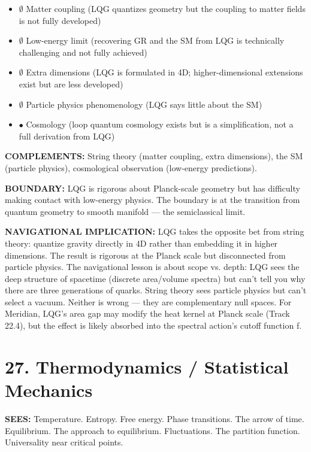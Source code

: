 \begin{itemize}[nosep,leftmargin=*]
  \item $\emptyset$ Matter coupling (LQG quantizes geometry but the coupling to matter fields is not fully developed)
  \item $\emptyset$ Low-energy limit (recovering GR and the SM from LQG is technically challenging and not fully achieved)
  \item $\emptyset$ Extra dimensions (LQG is formulated in 4D; higher-dimensional extensions exist but are less developed)
  \item $\emptyset$ Particle physics phenomenology (LQG says little about the SM)
  \item $\bullet$ Cosmology (loop quantum cosmology exists but is a simplification, not a full derivation from LQG)
\end{itemize}


\textbf{COMPLEMENTS:} String theory (matter coupling, extra dimensions), the SM (particle physics), cosmological observation (low-energy predictions).


\textbf{BOUNDARY:} LQG is rigorous about Planck-scale geometry but has difficulty making contact with low-energy physics. The boundary is at the transition from quantum geometry to smooth manifold — the semiclassical limit.


\textbf{NAVIGATIONAL IMPLICATION:} LQG takes the opposite bet from string theory: quantize gravity directly in 4D rather than embedding it in higher dimensions. The result is rigorous at the Planck scale but disconnected from particle physics. The navigational lesson is about scope vs. depth: LQG sees the deep structure of spacetime (discrete area/volume spectra) but can't tell you why there are three generations of quarks. String theory sees particle physics but can't select a vacuum. Neither is wrong — they are complementary null spaces. For Meridian, LQG's area gap may modify the heat kernel at Planck scale (Track 22.4), but the effect is likely absorbed into the spectral action's cutoff function f.


\bigskip\noindent\makebox[\textwidth]{\color{rulegray}\rule{5cm}{0.3pt}}\bigskip


\section*{27. Thermodynamics / Statistical Mechanics}


\textbf{SEES:} Temperature. Entropy. Free energy. Phase transitions. The arrow of time. Equilibrium. The approach to equilibrium. Fluctuations. The partition function. Universality near critical points.



